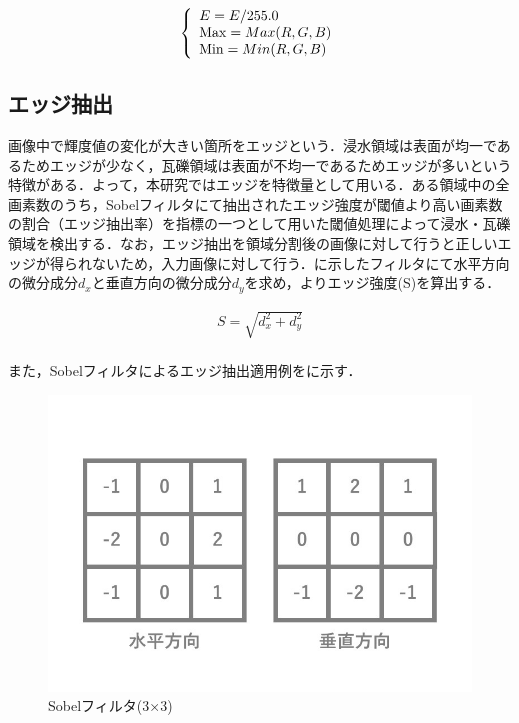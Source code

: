 \documentclass[../Thesis]{subfiles}
\begin{document}
  \begin{equation}
    \left\{
      \begin{array}{l}
        E = E / 255.0 \\
        {\rm Max} = Max(R,G,B) \\
        {\rm Min} = Min(R,G,B)
      \end{array}
    \right.
  \label{form09}
  \end{equation}
  
\subsection{エッジ抽出}
  画像中で輝度値の変化が大きい箇所をエッジという．浸水領域は表面が均一であるためエッジが少なく，瓦礫領域は表面が不均一であるためエッジが多いという特徴がある．よって，本研究ではエッジを特徴量として用いる．ある領域中の全画素数のうち，Sobelフィルタにて抽出されたエッジ強度が閾値より高い画素数の割合（エッジ抽出率）を指標の一つとして用いた閾値処理によって浸水・瓦礫領域を検出する．なお，エッジ抽出を領域分割後の画像に対して行うと正しいエッジが得られないため，入力画像に対して行う．に示したフィルタにて水平方向の微分成分$d_x$と垂直方向の微分成分$d_y$を求め，よりエッジ強度(S)を算出する．
  
  \begin{equation}
  \begin{array}{l}
    S = \sqrt{d_x^2+d_y^2} \\
  \end{array}
  \label{form10}
  \end{equation}
  
  また，Sobelフィルタによるエッジ抽出適用例をに示す．

  \begin{figure}[tbp]
		\centering
		\includegraphics[width=12cm]{img/sobel.jpg}
		\caption{Sobelフィルタ(3×3)}
		\label{img04}
  \end{figure}
  
\end{document}
